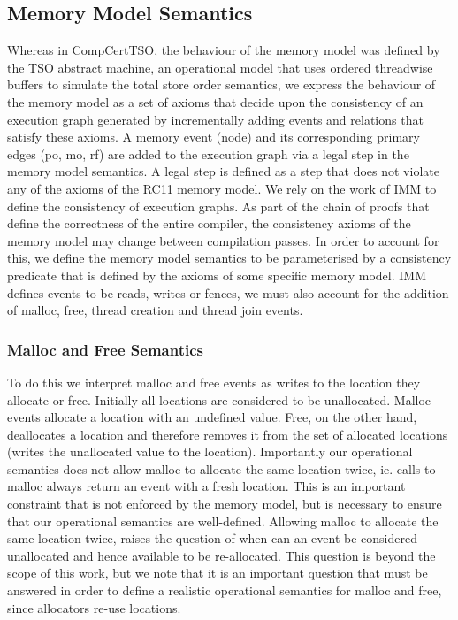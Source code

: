 \subsection{Memory Model Semantics}
Whereas in CompCertTSO, the behaviour of the memory model was defined by the TSO abstract machine, an operational model that uses ordered threadwise buffers to simulate the total store order semantics, 
we express the behaviour of the memory model as a set of axioms that decide upon the consistency of an execution graph generated by incrementally adding events and relations that satisfy these axioms.
A memory event (node) and its corresponding primary edges (po, mo, rf) are added to the execution graph via a legal step in the memory model semantics. A legal step is defined as a step that does not violate any of the axioms of the RC11 memory model. 
We rely on the work of IMM to define the consistency of execution graphs. 
As part of the chain of proofs that define the correctness of the entire compiler, the consistency axioms of the memory model may change between compilation passes.
In order to account for this, we define the memory model semantics to be parameterised by a consistency predicate that is defined by the axioms of some specific memory model.
IMM defines events to be reads, writes or fences, we must also account for the addition of malloc, free, thread creation and thread join events.

\subsubsection{Malloc and Free Semantics} 
To do this we interpret malloc and free events as writes to the location they allocate or free. Initially all locations are considered to be unallocated. Malloc events allocate a location with an undefined value. 
Free, on the other hand, deallocates a location and therefore removes it from the set of allocated locations (writes the unallocated value to the location). 
Importantly our operational semantics does not allow malloc to allocate the same location twice, ie. calls to malloc always return an event with a fresh location. 
This is an important constraint that is not enforced by the memory model, but is necessary to ensure that our operational semantics are well-defined. 
Allowing malloc to allocate the same location twice, raises the question of when can an event be considered unallocated and hence available to be re-allocated. 
This question is beyond the scope of this work, but we note that it is an important question that must be answered in order to define a realistic operational semantics for malloc and free, since allocators re-use locations. 

